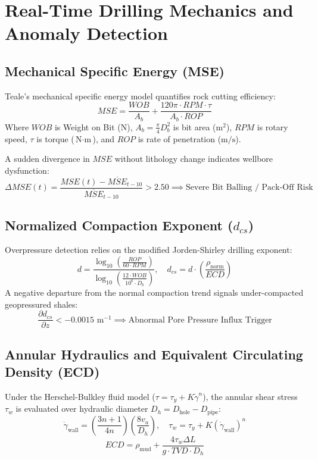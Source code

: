 \documentclass[11pt,a4paper]{article}
\begin{document}
\section{Real-Time Drilling Mechanics and Anomaly Detection}

\subsection{Mechanical Specific Energy (MSE)}
Teale's mechanical specific energy model quantifies rock cutting efficiency:
\begin{equation}
MSE = \frac{WOB}{A_b} + \frac{120 \pi \cdot RPM \cdot \tau}{A_b \cdot ROP}
\end{equation}
Where $WOB$ is Weight on Bit ($\text{N}$), $A_b = \frac{\pi}{4} D_b^2$ is bit area ($\text{m}^2$), $RPM$ is rotary speed, $\tau$ is torque ($\text{N}\cdot\text{m}$), and $ROP$ is rate of penetration ($\text{m/s}$).

A sudden divergence in $MSE$ without lithology change indicates wellbore dysfunction:
\begin{equation}
\Delta MSE(t) = \frac{MSE(t) - \overline{MSE}_{t-10}}{\overline{MSE}_{t-10}} > 2.50 \implies \text{Severe Bit Balling / Pack-Off Risk}
\end{equation}

\subsection{Normalized Compaction Exponent ($d_{cs}$)}
Overpressure detection relies on the modified Jorden-Shirley drilling exponent:
\begin{equation}
d = \frac{\log_{10}\left(\frac{ROP}{60 \cdot RPM}\right)}{\log_{10}\left(\frac{12 \cdot WOB}{10^6 \cdot D_b}\right)}, \quad d_{cs} = d \cdot \left(\frac{\rho_{\text{norm}}}{ECD}\right)
\end{equation}
A negative departure from the normal compaction trend signals under-compacted geopressured shales:
\begin{equation}
\frac{\partial d_{cs}}{\partial z} < -0.0015\text{ m}^{-1} \implies \text{Abnormal Pore Pressure Influx Trigger}
\end{equation}

\subsection{Annular Hydraulics and Equivalent Circulating Density (ECD)}
Under the Herschel-Bulkley fluid model ($\tau = \tau_y + K \dot{\gamma}^n$), the annular shear stress $\tau_w$ is evaluated over hydraulic diameter $D_h = D_{\text{hole}} - D_{\text{pipe}}$:
\begin{equation}
\dot{\gamma}_{\text{wall}} = \left(\frac{3n + 1}{4n}\right) \left(\frac{8 v_a}{D_h}\right), \quad \tau_w = \tau_y + K \left(\dot{\gamma}_{\text{wall}}\right)^n
\end{equation}
\begin{equation}
ECD = \rho_{\text{mud}} + \frac{4 \tau_w \Delta L}{g \cdot TVD \cdot D_h}
\end{equation}
\end{document}

